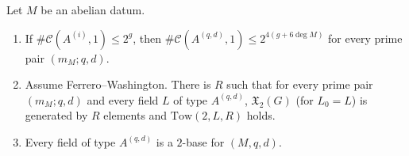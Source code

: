 \begin{proposition}\label{pf:vwin:twobasethm}
Let $M$ be an abelian datum.
\begin{enumerate}[label=(\alph*)]
\item\label{pf:vwin:twobasethm-a} If $\#\mathcal C(A^{(i)},1)\le2^g$, then $\#\mathcal C(A^{(q,d)},1)\le2^{4(g+6\deg M)}$ for every prime pair $(m_M;q,d)$.
\item\label{pf:vwin:twobasethm-b} Assume Ferrero--Washington. There is $R$ such that for every prime pair $(m_M;q,d)$ and every field $L$ of type
$A^{(q,d)}$, $\mathfrak X_2(G)$ (for $L_0=L$) is generated by $R$ elements and $\mathrm{Tow}(2,L,R)$ holds.
\item\label{pf:vwin:twobasethm-c} Every field of type $A^{(q,d)}$ is a $2$-base for $(M,q,d)$.
\end{enumerate}
\end{proposition}

